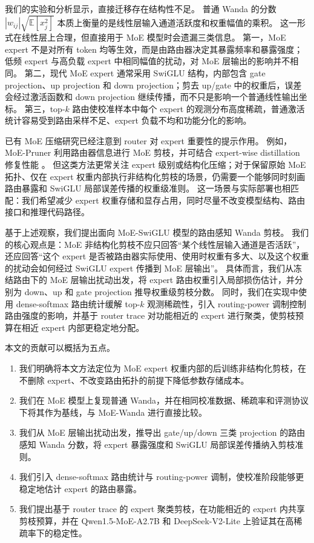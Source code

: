 \documentclass[letterpaper]{article}
\begin{document}
我们的实验和分析显示，直接迁移存在结构性不足。
普通 Wanda 的分数
$|w_{ij}|\sqrt{\mathbb{E}[x_j^2]}$
本质上衡量的是线性层输入通道活跃度和权重幅值的乘积。
这一形式在线性层上合理，但直接用于 MoE 模型时会遗漏三类信息。
第一，MoE expert 不是对所有 token 均等生效，而是由路由器决定其暴露频率和暴露强度；低频 expert 与高负载 expert 中相同幅值的扰动，对 MoE 层输出的影响并不相同。
第二，现代 MoE expert 通常采用 SwiGLU 结构，内部包含 gate projection、up projection 和 down projection；剪去 up/gate 中的权重后，误差会经过激活函数和 down projection 继续传播，而不只是影响一个普通线性输出坐标。
第三，top-$k$ 路由使校准样本中每个 expert 的观测分布高度稀疏，普通激活统计容易受到路由采样不足、expert 负载不均和功能分化的影响。

已有 MoE 压缩研究已经注意到 router 对 expert 重要性的提示作用。
例如，MoE-Pruner 利用路由器信息进行 MoE 剪枝，并可结合 expert-wise distillation 修复性能 \cite{moepruner2024}。
但这类方法更常关注 expert 级别或结构化压缩；对于保留原始 MoE 拓扑、仅在 expert 权重内部执行非结构化剪枝的场景，仍需要一个能够同时刻画路由暴露和 SwiGLU 局部误差传播的权重级准则。
这一场景与实际部署也相匹配：我们希望减少 expert 权重存储和显存占用，同时尽量不改变模型结构、路由接口和推理代码路径。

基于上述观察，我们提出面向 MoE-SwiGLU 模型的路由感知 Wanda 剪枝。
我们的核心观点是：MoE 非结构化剪枝不应只回答“某个线性层输入通道是否活跃”，还应回答“这个 expert 是否被路由器实际使用、使用时权重有多大、以及这个权重的扰动会如何经过 SwiGLU expert 传播到 MoE 层输出”。
具体而言，我们从冻结路由下的 MoE 层输出扰动出发，将 expert 路由权重引入局部损伤估计，并分别为 down、up 和 gate projection 推导权重级剪枝分数。
同时，我们在实现中使用 dense-softmax 路由统计缓解 top-$k$ 观测稀疏性，引入 routing-power 调制控制路由强度的影响，并基于 router trace 对功能相近的 expert 进行聚类，使剪枝预算在相近 expert 内部更稳定地分配。

本文的贡献可以概括为五点。
\begin{enumerate}[leftmargin=*]
    \item 我们明确将本文方法定位为 MoE expert 权重内部的后训练非结构化剪枝，在不删除 expert、不改变路由拓扑的前提下降低参数存储成本。
    \item 我们在 MoE 模型上复现普通 Wanda，并在相同校准数据、稀疏率和评测协议下将其作为基线，与 MoE-Wanda 进行直接比较。
    \item 我们从 MoE 层输出扰动出发，推导出 gate/up/down 三类 projection 的路由感知 Wanda 分数，将 expert 暴露强度和 SwiGLU 局部误差传播纳入剪枝准则。
    \item 我们引入 dense-softmax 路由统计与 routing-power 调制，使校准阶段能够更稳定地估计 expert 的路由暴露。
    \item 我们提出基于 router trace 的 expert 聚类剪枝，在功能相近的 expert 内共享剪枝预算，并在 Qwen1.5-MoE-A2.7B 和 DeepSeek-V2-Lite 上验证其在高稀疏率下的稳定性。
\end{enumerate}
\end{document}
